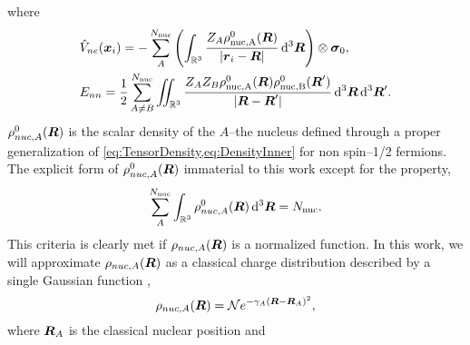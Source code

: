 where
\begin{align}
  &\hat{V}_{ne}(\boldsymbol{x}_i) = 
    -\sum^{N_\mathrm{nuc}}_A \left(\int_{\mathbb R^3} \frac{Z_A\rho^0_\mathrm{nuc,A}(\boldsymbol{R})}{\vert \boldsymbol{r}_i - \boldsymbol{R} \vert} \,\mathrm{d}^3\boldsymbol{R}\right) \otimes \boldsymbol{\sigma}_{0}, \\
&E_{nn} = \frac{1}{2} \sum^{N_\mathrm{nuc}}_{A\neq B} \int\mkern-12mu\int_{\mathbb R^3} \frac{Z_AZ_B\rho^0_\mathrm{nuc,A}(\boldsymbol{R})\rho^0_\mathrm{nuc,B}(\boldsymbol{R}')}{\vert \boldsymbol{R} - \boldsymbol{R}' \vert} \,\mathrm{d}^3\boldsymbol{R} \,\mathrm{d}^3\boldsymbol{R}'.
\end{align}
$\rho^0_{nuc,A}(\boldsymbol{R})$ is the scalar density of the $A$--the nucleus defined through a proper generalization of
\cref{eq:TensorDensity,eq:DensityInner} for non spin--1/2 fermions. The explicit form of $\rho^0_{nuc,A}(\boldsymbol{R})$ immaterial
to this work except for the property,
\begin{equation}
\sum_A^{N_\mathrm{nuc}} \int_{\mathbb R^3} \rho_{nuc,A}^0(\boldsymbol{R}) \,\mathrm{d}^3\boldsymbol{R} = N_\mathrm{nuc}.
\end{equation}
This criteria is clearly met if $\rho_{nuc,A}(\boldsymbol{R})$ is a normalized function. In this work, we will approximate
$\rho_{nuc,A}(\boldsymbol{R})$ as a classical charge distribution described by a single Gaussian function ,
\begin{equation}
\rho_{nuc,A}(\boldsymbol{R}) = \mathcal{N} e^{-\gamma_A(\boldsymbol{R} - \boldsymbol{R}_A)^2},
\end{equation}
where $\boldsymbol{R}_A$ is the classical nuclear position and 


